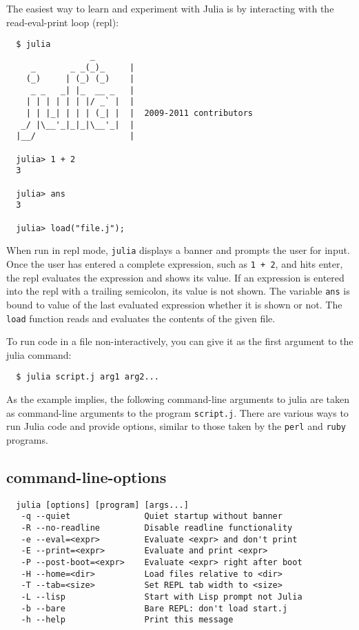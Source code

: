 \documentclass{article}
\begin{document}
The easiest way to learn and experiment with Julia is by interacting with the read-eval-print loop (repl):
\begin{verbatim}
  $ julia
                 _      
     _       _ _(_)_     |
    (_)     | (_) (_)    |  
     _ _   _| |_  __ _   |
    | | | | | | |/ _` |  |
    | | |_| | | | (_| |  |  2009-2011 contributors
   _/ |\__'_|_|_|\__'_|  |  
  |__/                   |

  julia> 1 + 2
  3

  julia> ans
  3

  julia> load("file.j");
\end{verbatim}
When run in repl mode, \verb|julia| displays a banner and prompts the user for input.
Once the user has entered a complete expression, such as \verb|1 + 2|, and hits enter, the repl evaluates the expression and shows its value.
If an expression is entered into the repl with a trailing semicolon, its value is not shown.
The variable \verb|ans| is bound to value of the last evaluated expression whether it is shown or not.
The \verb|load| function reads and evaluates the contents of the given file.

To run code in a file non-interactively, you can give it as the first argument to the julia command:
\begin{verbatim}
  $ julia script.j arg1 arg2...
\end{verbatim}
As the example implies, the following command-line arguments to julia are taken as command-line arguments to the program \verb|script.j|.
There are various ways to run Julia code and provide options, similar to those taken by the \verb|perl| and \verb|ruby| programs.

\subsection{command-line-options}

\begin{verbatim}
  julia [options] [program] [args...]
   -q --quiet               Quiet startup without banner
   -R --no-readline         Disable readline functionality
   -e --eval=<expr>         Evaluate <expr> and don't print
   -E --print=<expr>        Evaluate and print <expr>
   -P --post-boot=<expr>    Evaluate <expr> right after boot
   -H --home=<dir>          Load files relative to <dir>
   -T --tab=<size>          Set REPL tab width to <size>
   -L --lisp                Start with Lisp prompt not Julia
   -b --bare                Bare REPL: don't load start.j
   -h --help                Print this message
\end{verbatim}
\end{document}
